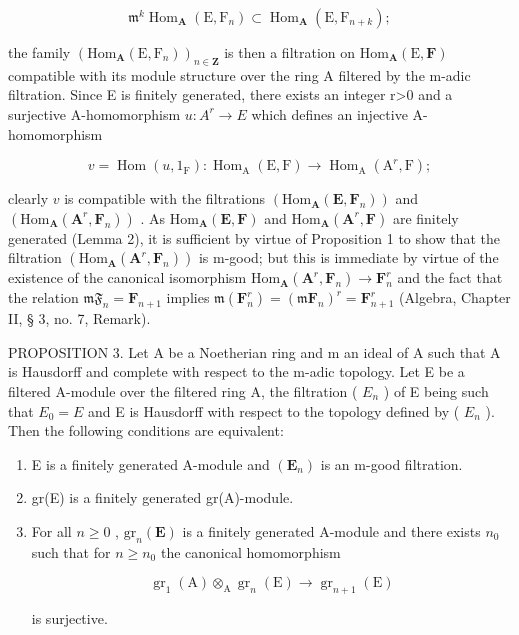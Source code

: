 \[
\mathfrak {m} ^ {k} \operatorname{Hom} _ {\mathbf {A}} (\mathrm{E}, \mathrm{F} _ {n}) \subset \operatorname{Hom} _ {\mathbf {A}} (\mathrm{E}, \mathrm{F} _ {n + k});
\]

the family \((\mathrm{Hom}_{\mathbf{A}}(\mathrm{E},\mathrm{F}_{n}))_{n\in\mathbf{Z}}\) is then a filtration on \(\mathrm{Hom}_{\mathbf{A}}(\mathrm{E},\mathbf{F})\) compatible with its module structure over the ring A filtered by the m-adic filtration. Since E is finitely generated, there exists an integer r\textgreater0 and a surjective A-homomorphism \(u:A^{r}\rightarrow E\) which defines an injective A-homomorphism

\[
v = \operatorname{Hom} (u, 1 _ {\mathrm{F}}): \operatorname{Hom} _ {\mathrm{A}} (\mathrm{E}, \mathrm{F}) \rightarrow \operatorname{Hom} _ {\mathrm{A}} (\mathrm{A} ^ {r}, \mathrm{F});
\]

clearly \(v\) is compatible with the filtrations \((\mathrm{Hom}_{\mathbf{A}}(\mathbf{E},\mathbf{F}_n))\) and \((\mathrm{Hom}_{\mathbf{A}}(\mathbf{A}^r,\mathbf{F}_n))\) . As \(\mathrm{Hom}_{\mathbf{A}}(\mathbf{E},\mathbf{F})\) and \(\mathrm{Hom}_{\mathbf{A}}(\mathbf{A}^r,\mathbf{F})\) are finitely generated (Lemma 2), it is sufficient by virtue of Proposition 1 to show that the filtration \((\mathrm{Hom}_{\mathbf{A}}(\mathbf{A}^{r},\mathbf{F}_{n}))\) is m-good; but this is immediate by virtue of the existence of the canonical isomorphism \(\mathrm{Hom}_{\mathbf{A}}(\mathbf{A}^{r},\mathbf{F}_{n})\to \mathbf{F}_{n}^{r}\) and the fact that the relation \(\mathfrak{mF}_n = \mathbf{F}_{n + 1}\) implies \(\mathfrak{m}(\mathbf{F}_n^r) = (\mathfrak{m}\mathbf{F}_n)^r = \mathbf{F}_{n + 1}^r\) (Algebra, Chapter II, § 3, no. 7, Remark).

PROPOSITION 3. Let A be a Noetherian ring and m an ideal of A such that A is Hausdorff and complete with respect to the m-adic topology. Let E be a filtered A-module over the filtered ring A, the filtration ( \(E_{n}\) ) of E being such that \(E_{0} = E\) and E is Hausdorff with respect to the topology defined by ( \(E_{n}\) ). Then the following conditions are equivalent:

\begin{enumerate}
\def\labelenumi{(\alph{enumi})}
\item
  E is a finitely generated A-module and \((\mathbf{E}_{n})\) is an m-good filtration.
\item
  gr(E) is a finitely generated gr(A)-module.
\item
  For all \(n \geqslant 0\) , \(\mathrm{gr}_n(\mathbf{E})\) is a finitely generated A-module and there exists \(n_0\) such that for \(n \geqslant n_0\) the canonical homomorphism

\[
\operatorname{gr} _ {1} (\mathrm{A}) \otimes_ {\mathrm{A}} \operatorname{gr} _ {n} (\mathrm{E}) \rightarrow \operatorname{gr} _ {n + 1} (\mathrm{E})\tag{3}
\]

is surjective.
\end{enumerate}

